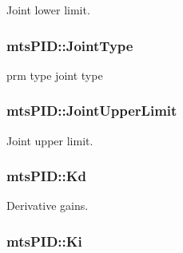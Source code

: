Joint lower limit. 

\hypertarget{classmts_p_i_d_ae108b12c62723774cee553f7e76213f6}{}
\subsubsection[{Joint\+Type}]{ mts\+P\+I\+D\+::\+Joint\+Type\hspace{0.3cm}{\ttfamily [protected]}}\label{classmts_p_i_d_ae108b12c62723774cee553f7e76213f6}


prm type joint type 

\hypertarget{classmts_p_i_d_a6a6f2a5123f6816f47d5c752ba7020d5}{}
\subsubsection[{Joint\+Upper\+Limit}]{ mts\+P\+I\+D\+::\+Joint\+Upper\+Limit\hspace{0.3cm}{\ttfamily [protected]}}\label{classmts_p_i_d_a6a6f2a5123f6816f47d5c752ba7020d5}


Joint upper limit. 

\hypertarget{classmts_p_i_d_a4d288bb566a2c45834c1f028cad03b3f}{}
\subsubsection[{Kd}]{ mts\+P\+I\+D\+::\+Kd\hspace{0.3cm}{\ttfamily [protected]}}\label{classmts_p_i_d_a4d288bb566a2c45834c1f028cad03b3f}


Derivative gains. 

\hypertarget{classmts_p_i_d_a979243fca1ea255c49b241658246d964}{}
\subsubsection[{Ki}]{ mts\+P\+I\+D\+::\+Ki\hspace{0.3cm}{\ttfamily [protected]}}\label{classmts_p_i_d_a979243fca1ea255c49b241658246d964}


